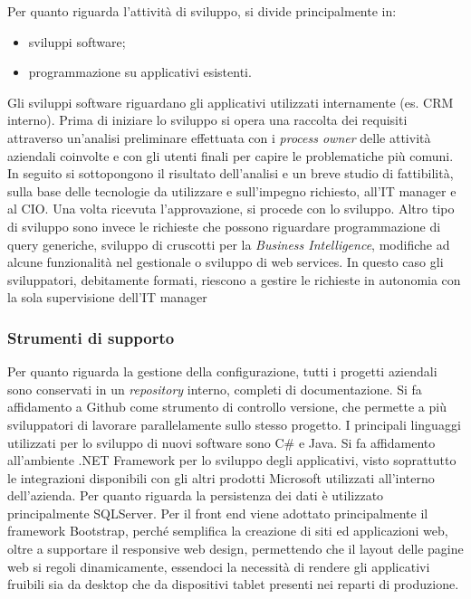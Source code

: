 Per quanto riguarda l'attività di sviluppo, si divide principalmente in: 
\begin{itemize}
	\item sviluppi software; 
	\item programmazione su applicativi esistenti.
\end{itemize}
Gli sviluppi software riguardano gli applicativi utilizzati internamente (es. CRM interno). Prima di iniziare lo sviluppo si opera una raccolta dei requisiti attraverso un'analisi preliminare effettuata con i \textit{process owner} delle attività aziendali coinvolte e con gli utenti finali per capire le problematiche più comuni. In seguito si sottopongono il risultato dell'analisi e un breve studio di fattibilità, sulla base delle tecnologie da utilizzare e sull'impegno richiesto, all'IT manager e al CIO. Una volta ricevuta l'approvazione, si procede con lo sviluppo. 
Altro tipo di sviluppo sono invece le richieste che possono riguardare programmazione di query generiche, sviluppo di cruscotti per la \textit{Business Intelligence}, modifiche ad alcune funzionalità nel gestionale o sviluppo di web services. In questo caso gli sviluppatori, debitamente formati, riescono a gestire le richieste in autonomia con la sola supervisione dell'IT manager



\subsubsection{Strumenti di supporto}

Per quanto riguarda la gestione della configurazione, tutti i progetti aziendali sono conservati in un \textit{repository} interno, completi di documentazione. Si fa affidamento a Github come strumento di controllo versione, che permette a più sviluppatori di lavorare parallelamente sullo stesso progetto. 
I principali linguaggi utilizzati per lo sviluppo di nuovi software sono C\# e Java. 
Si fa affidamento all'ambiente .NET Framework per lo sviluppo degli applicativi, visto soprattutto le integrazioni disponibili con gli altri prodotti Microsoft utilizzati all'interno dell'azienda. 
Per quanto riguarda la persistenza dei dati è utilizzato principalmente SQLServer. 
Per il front end viene adottato principalmente il framework Bootstrap, perché semplifica la creazione di siti ed applicazioni web, oltre a supportare il responsive web design, permettendo che il layout delle pagine web si regoli dinamicamente, essendoci la necessità di rendere gli applicativi fruibili sia da desktop che da dispositivi tablet presenti nei reparti di produzione.

